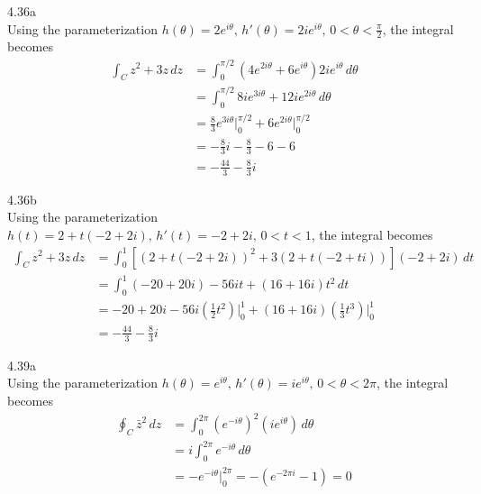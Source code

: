 \documentclass{article}
\theoremstyle{definition}
\begin{document}
	\newpage

	\begin{prob}{4.36a} $  $ \vspace{2mm} \\
		Using the parameterization $ h(\theta) = 2e^{i\theta}, \, h'(\theta) = 2ie^{i\theta}, \, 0<\theta < \frac{\pi}{2} $, the integral becomes
		\begin{align*}
			\int_C z^2 + 3z \, dz &= \int_{0}^{\pi/2} \left( 4e^{2i\theta} + 6e^{i\theta} \right) 2ie^{i\theta} \, d\theta \\
			&= \int_{0}^{\pi/2} 8ie^{3i\theta} + 12ie^{2i\theta} \, d\theta \\
			&= \frac{8}{3} e^{3i\theta} \Big|_{0}^{\pi/2} + 6e^{2i\theta} \Big|_{0}^{\pi/2} \\
			&= -\frac{8}{3}i - \frac{8}{3} - 6 - 6\\
			&= \boxed{-\frac{44}{3} - \frac{8}{3}i}
		\end{align*}
	\end{prob}

	\begin{prob}{4.36b} $  $ \vspace{2mm} \\
		Using the parameterization $ h(t) = 2 + t(-2+2i), \, h'(t) = -2+2i, \, 0<t<1 $, the integral becomes
		\begin{align*}
			\int_C z^2 + 3z \, dz &= \int_{0}^{1} [ (2+t(-2+2i))^2 + 3(2+t(-2+ti)) ](-2+2i) \, dt \\
			&= \int_{0}^{1} (-20+20i) - 56it + (16+16i)t^2 \, dt \\
			&= -20+20i - 56i \left( \frac{1}{2} t^2 \right)\Big|_{0}^{1} + (16+16i) \left(\frac{1}{3}t^3\right) \Big|_{0}^{1} \\
			&= \boxed{-\frac{44}{3} - \frac{8}{3}i}
		\end{align*}
	\end{prob}

	\begin{prob}{4.39a} $  $ \vspace{2mm} \\
		Using the parameterization $ h(\theta) = e^{i\theta}, \, h'(\theta) = ie^{i\theta}, \, 0<\theta<2\pi $, the integral becomes
		\begin{align*}
			\oint_C \bar{z}^2 \, dz &= \int_{0}^{2\pi} \left( e^{-i\theta} \right)^2 \left(ie^{i\theta}\right) \, d\theta \\
			&= i\int_{0}^{2\pi} e^{-i\theta} \, d\theta \\
			&= -e^{-i\theta} \Big|_{0}^{2\pi} = -\left( e^{-2\pi i} -1  \right) = \boxed{0}
		\end{align*}
	\end{prob}
\end{document}
